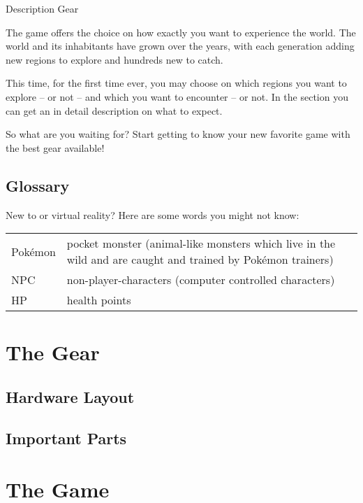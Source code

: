 Description Gear \medskip

The game offers the choice on how exactly you want to experience the \poke{} world. The world and its inhabitants have grown over the years, with each generation adding new regions to explore and hundreds new \poke{} to catch.

This time, for the first time ever, you may choose on which regions you want to explore -- or not -- and which  \poke{} you want to encounter -- or not. In the section \textit{} you can get an in detail description on what to expect.

So what are you waiting for? Start getting to know your new favorite \poke{} game with the best gear available!

\section{Glossary}
New to \poke{} or virtual reality? Here are some words you might not know:\\
\begin{tabular}{L{.3}L{.7}}
Pokémon\newline & pocket monster (animal-like monsters which live in the wild and are caught and trained by Pokémon trainers)\\
NPC & non-player-characters (computer controlled characters)\\
HP & health points
\end{tabular}

\chapter{The Gear}


\section{Hardware Layout}


\section{Important Parts}


\chapter{The Game}

